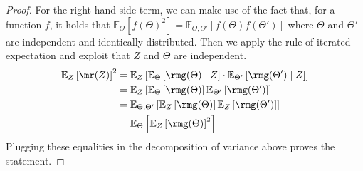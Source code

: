 \documentclass[
    a4paper, %
	fontsize=10pt, %
	twoside=false, %
]{kaobook}
\begin{document}
\begin{proof}
For the right-hand-side term, we can make use of the fact that, for a function $f$, it holds that $\mathbb{E}_{\Theta}\left[ f(\Theta)^2 \right] = \mathbb{E}_{\Theta, \Theta'}\left[ f(\Theta) f(\Theta') \right]$ where $\Theta$ and $\Theta'$ are independent and identically distributed. Then we apply the rule of iterated expectation and exploit that $Z$ and $\Theta$ are independent.
\begin{align*}
\mathbb{E}_{Z}\left[ \mr(Z) \right] ^2 &= \mathbb{E}_{Z}\left[ \mathbb{E}_{\Theta}\left[ \rmg(\Theta) \mid Z \right] \cdot \mathbb{E}_{\Theta'}\left[ \rmg(\Theta') \mid Z  \right]  \right] %
\\ 
&=  \mathbb{E}_{Z}\left[ \mathbb{E}_{\Theta}\left[ \rmg(\Theta) \right] \mathbb{E}_{\Theta'}\left[  \rmg(\Theta') \right]  \right]   \\
&= \mathbb{E}_{\Theta, \Theta'}\left[ \mathbb{E}_{Z}\left[ \rmg(\Theta) \right] \mathbb{E}_{Z}\left[ \rmg(\Theta') \right]    \right] \\
&= \mathbb{E}_{\Theta}\left[ \mathbb{E}_{Z}\left[ \rmg(\Theta)   \right]^2  \right]
\end{align*} 
Plugging these equalities in the decomposition of variance above proves the statement.

\end{proof}
\end{document}
